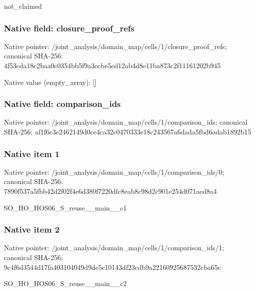 \documentclass[10pt,a4paper]{article}
\begin{document}
\begingroup\raggedright\sloppy not\_\allowbreak{}claimed\par\endgroup

\subsubsection{Native field: closure\_\allowbreak{}proof\_\allowbreak{}refs}
Native pointer: /joint\_\allowbreak{}analysis/domain\_\allowbreak{}map/cells/1/closure\_\allowbreak{}proof\_\allowbreak{}refs; canonical SHA-256: 4f53cda18c2baa0c0354bb5f9a3ecbe5ed12ab4d8e11ba873c2f11161202b945

Native value (empty\_\allowbreak{}array): []

\subsubsection{Native field: comparison\_\allowbreak{}ids}
Native pointer: /joint\_\allowbreak{}analysis/domain\_\allowbreak{}map/cells/1/comparison\_\allowbreak{}ids; canonical SHA-256: af1f6c3e2462149d0ce4ca32c0470333e18c243567a6dada5fbd6adab1892b15

\subsubsection{Native item 1}
Native pointer: /joint\_\allowbreak{}analysis/domain\_\allowbreak{}map/cells/1/comparison\_\allowbreak{}ids/0; canonical SHA-256: 7890f537a5fbb42d2f02f4e6d380f7220dfc8eab8c98d2c901e254d071aed8a4

\begingroup\raggedright\sloppy SO\_\allowbreak{}HO\_\allowbreak{}HOS06\_\allowbreak{}S\_\allowbreak{}reuse\_\allowbreak{}\_\allowbreak{}main\_\allowbreak{}\_\allowbreak{}c1\par\endgroup

\subsubsection{Native item 2}
Native pointer: /joint\_\allowbreak{}analysis/domain\_\allowbreak{}map/cells/1/comparison\_\allowbreak{}ids/1; canonical SHA-256: 9c4f6d3544d17fa403104049d9de5c10143df23cdb9a22160925687532cba65c

\begingroup\raggedright\sloppy SO\_\allowbreak{}HO\_\allowbreak{}HOS06\_\allowbreak{}S\_\allowbreak{}reuse\_\allowbreak{}\_\allowbreak{}main\_\allowbreak{}\_\allowbreak{}c2\par\endgroup
\end{document}
